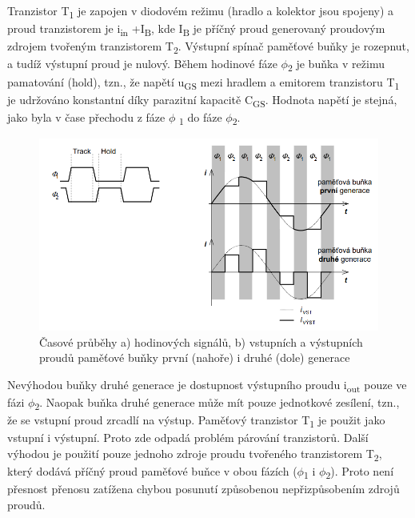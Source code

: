 Tranzistor T\textsubscript{1} je zapojen v diodovém režimu (hradlo a kolektor jsou spojeny) a proud tranzistorem je i\textsubscript{in} +I\textsubscript{B}, kde I\textsubscript{B} je příčný proud generovaný proudovým zdrojem tvořeným tranzistorem T\textsubscript{2}. Výstupní spínač paměťové buňky je rozepnut, a tudíž výstupní proud je nulový. Během hodinové fáze $\phi$\textsubscript{2} je buňka v režimu pamatování (hold), tzn., že napětí u\textsubscript{GS} mezi hradlem a emitorem tranzistoru T\textsubscript{1} je udržováno konstantní díky parazitní kapacitě C\textsubscript{GS}. Hodnota napětí je stejná, jako byla v čase přechodu z fáze $\phi$ \textsubscript{1} do fáze $\phi$\textsubscript{2}.
\begin{figure}[h]
   \begin{center}
     \includegraphics[scale=0.8]{images/time_SI.png}
   \end{center}
   \caption{Časové průběhy a) hodinových signálů, b) vstupních a výstupních proudů paměťové buňky první (nahoře) i druhé (dole) generace}
\end{figure}

Nevýhodou buňky druhé generace je dostupnost výstupního proudu i\textsubscript{out} pouze ve fázi $\phi$\textsubscript{2}. Naopak buňka druhé generace může mít pouze jednotkové zesílení, tzn., že se vstupní proud zrcadlí na výstup. Paměťový tranzistor T\textsubscript{1} je použit jako vstupní i výstupní. Proto zde odpadá problém párování tranzistorů. Další výhodou je použití pouze jednoho zdroje proudu tvořeného tranzistorem T\textsubscript{2}, který dodává příčný proud paměťové buňce v obou fázích ($\phi$\textsubscript{1} i $\phi$\textsubscript{2}). Proto není přesnost přenosu zatížena chybou posunutí způsobenou nepřizpůsobením zdrojů proudů.





